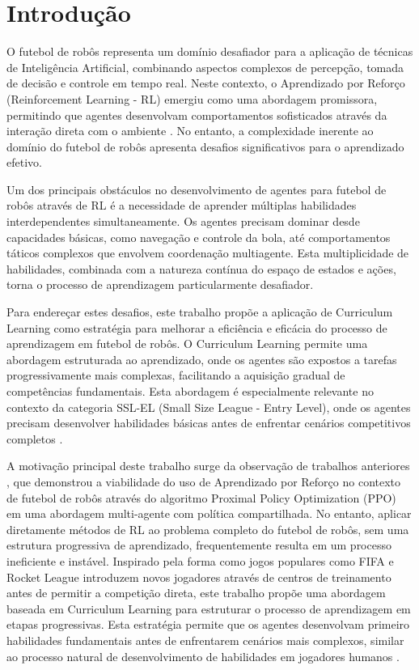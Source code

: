 
\chapter{Introdução}
\label{cap:intro}

O futebol de robôs representa um domínio desafiador para a aplicação de técnicas de Inteligência Artificial, combinando aspectos complexos de percepção, tomada de decisão e controle em tempo real. Neste contexto, o Aprendizado por Reforço (Reinforcement Learning - RL) emergiu como uma abordagem promissora, permitindo que agentes desenvolvam comportamentos sofisticados através da interação direta com o ambiente \cite{sutton}. No entanto, a complexidade inerente ao domínio do futebol de robôs apresenta desafios significativos para o aprendizado efetivo.

Um dos principais obstáculos no desenvolvimento de agentes para futebol de robôs através de RL é a necessidade de aprender múltiplas habilidades interdependentes simultaneamente. Os agentes precisam dominar desde capacidades básicas, como navegação e controle da bola, até comportamentos táticos complexos que envolvem coordenação multiagente. Esta multiplicidade de habilidades, combinada com a natureza contínua do espaço de estados e ações, torna o processo de aprendizagem particularmente desafiador.

Para endereçar estes desafios, este trabalho propõe a aplicação de Curriculum Learning como estratégia para melhorar a eficiência e eficácia do processo de aprendizagem em futebol de robôs. O Curriculum Learning permite uma abordagem estruturada ao aprendizado, onde os agentes são expostos a tarefas progressivamente mais complexas, facilitando a aquisição gradual de competências fundamentais. Esta abordagem é especialmente relevante no contexto da categoria SSL-EL (Small Size League - Entry Level), onde os agentes precisam desenvolver habilidades básicas antes de enfrentar cenários competitivos completos \cite{regras_ssl_el_2024}.

A motivação principal deste trabalho surge da observação de trabalhos anteriores \cite{bruno_brandao}, que demonstrou a viabilidade do uso de Aprendizado por Reforço no contexto de futebol de robôs através do algoritmo Proximal Policy Optimization (PPO) em uma abordagem multi-agente com política compartilhada. No entanto, aplicar diretamente métodos de RL ao problema completo do futebol de robôs, sem uma estrutura progressiva de aprendizado, frequentemente resulta em um processo ineficiente e instável. Inspirado pela forma como jogos populares como FIFA e Rocket League introduzem novos jogadores através de centros de treinamento antes de permitir a competição direta, este trabalho propõe uma abordagem baseada em Curriculum Learning para estruturar o processo de aprendizagem em etapas progressivas. Esta estratégia permite que os agentes desenvolvam primeiro habilidades fundamentais antes de enfrentarem cenários mais complexos, similar ao processo natural de desenvolvimento de habilidades em jogadores humanos \cite{relay_long_horizon}.

